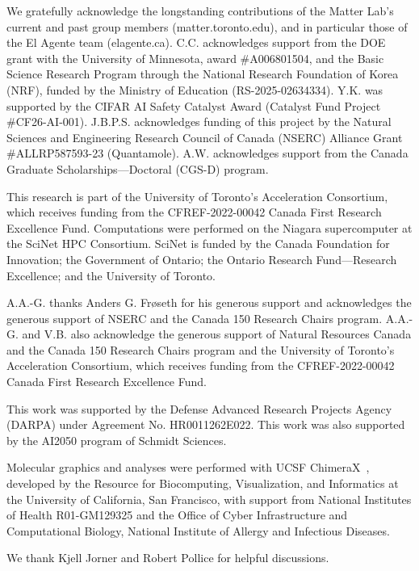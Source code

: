 We gratefully acknowledge the longstanding contributions of the Matter Lab’s current and past group members (matter.toronto.edu), and in particular those of the El Agente team (elagente.ca). C.C. acknowledges support from the DOE grant with the University of Minnesota, award \#A006801504, and the Basic Science Research Program through the National Research Foundation of Korea (NRF), funded by the Ministry of Education (RS-2025-02634334). Y.K. was supported by the CIFAR AI Safety Catalyst Award (Catalyst Fund Project \#CF26-AI-001). J.B.P.S. acknowledges funding of this project by the Natural Sciences and Engineering Research Council of Canada (NSERC) Alliance Grant \#ALLRP587593-23 (Quantamole). A.W. acknowledges support from the Canada Graduate Scholarships—Doctoral (CGS-D) program.

This research is part of the University of Toronto’s Acceleration Consortium, which receives funding from the CFREF-2022-00042 Canada First Research Excellence Fund. Computations were performed on the Niagara supercomputer at the SciNet HPC Consortium. SciNet is funded by the Canada Foundation for Innovation; the Government of Ontario; the Ontario Research Fund—Research Excellence; and the University of Toronto.

A.A.-G. thanks Anders G. Frøseth for his generous support and acknowledges the generous support of NSERC and the Canada 150 Research Chairs program. A.A.-G. and V.B. also acknowledge the generous support of Natural Resources Canada and the Canada 150 Research Chairs program and the University of Toronto’s Acceleration Consortium, which receives funding from the CFREF-2022-00042 Canada First Research Excellence Fund.

This work was supported by the Defense Advanced Research Projects Agency (DARPA) under Agreement No. HR0011262E022. This work was also supported by the AI2050 program of Schmidt Sciences.

Molecular graphics and analyses were performed with UCSF ChimeraX~\citep{goddard2018chimerax,pettersen2021chimerax}, developed by the Resource for Biocomputing, Visualization, and Informatics at the University of California, San Francisco, with support from National Institutes of Health R01-GM129325 and the Office of Cyber Infrastructure and Computational Biology, National Institute of Allergy and Infectious Diseases.

We thank Kjell Jorner and Robert Pollice for helpful discussions.
